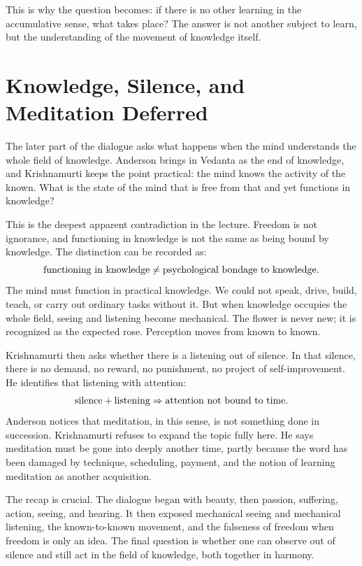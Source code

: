 This is why the question becomes: if there is no other learning in the accumulative sense, what takes place? The answer is not another subject to learn, but the understanding of the movement of knowledge itself.

\section{Knowledge, Silence, and Meditation Deferred}

The later part of the dialogue asks what happens when the mind understands the whole field of knowledge. Anderson brings in Vedanta as the end of knowledge, and Krishnamurti keeps the point practical: the mind knows the activity of the known. What is the state of the mind that is free from that and yet functions in knowledge?

This is the deepest apparent contradiction in the lecture. Freedom is not ignorance, and functioning in knowledge is not the same as being bound by knowledge. The distinction can be recorded as:
\begin{equation}
\hbox{functioning in knowledge}
\neq
\hbox{psychological bondage to knowledge}.
\end{equation}
The mind must function in practical knowledge. We could not speak, drive, build, teach, or carry out ordinary tasks without it. But when knowledge occupies the whole field, seeing and listening become mechanical. The flower is never new; it is recognized as the expected rose. Perception moves from known to known.

Krishnamurti then asks whether there is a listening out of silence. In that silence, there is no demand, no reward, no punishment, no project of self-improvement. He identifies that listening with attention:
\begin{equation}
\hbox{silence}+\hbox{listening}
\Rightarrow
\hbox{attention not bound to time}.
\end{equation}
Anderson notices that meditation, in this sense, is not something done in succession. Krishnamurti refuses to expand the topic fully here. He says meditation must be gone into deeply another time, partly because the word has been damaged by technique, scheduling, payment, and the notion of learning meditation as another acquisition.

The recap is crucial. The dialogue began with beauty, then passion, suffering, action, seeing, and hearing. It then exposed mechanical seeing and mechanical listening, the known-to-known movement, and the falseness of freedom when freedom is only an idea. The final question is whether one can observe out of silence and still act in the field of knowledge, both together in harmony.


